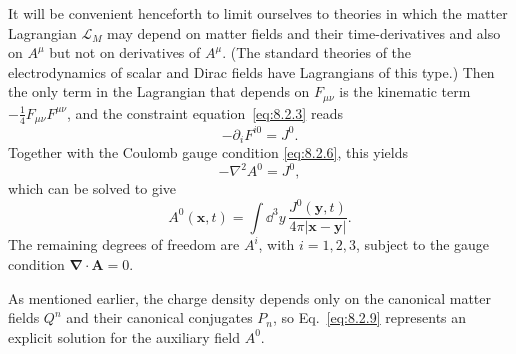It will be convenient henceforth to limit ourselves to theories in which
the matter Lagrangian $\mathcal L_M$ may depend on matter fields and their
time-derivatives and also on $A^\mu$ but not on derivatives of $A^\mu$. (The
standard theories of the electrodynamics of scalar and Dirac fields have
Lagrangians of this type.) Then the only term in the Lagrangian that depends
on $F_{\mu\nu}$ is the kinematic term $-\tfrac14F_{\mu\nu}F^{\mu\nu}$, and the
constraint equation~\eqref{eq:8.2.3} reads
\begin{equation}
  -\partial_iF^{i0}=J^0.
  \tag{8.2.7}\label{eq:8.2.7}
\end{equation}
Together with the Coulomb gauge condition \eqref{eq:8.2.6}, this yields
\begin{equation}
  -\nabla^2A^0=J^0,
  \tag{8.2.8}\label{eq:8.2.8}
\end{equation}
which can be solved to give
\begin{equation}
  A^0(\mathbf x,t)=\int \dd^3y\,
  \frac{J^0(\mathbf y,t)}{4\pi\lvert\mathbf x-\mathbf y\rvert}.
  \tag{8.2.9}\label{eq:8.2.9}
\end{equation}
The remaining degrees of freedom are $A^i$, with $i=1,2,3$, subject to the
gauge condition $\boldsymbol\nabla\cdot\mathbf A=0$.

As mentioned earlier, the charge density depends only on the canonical
matter fields $Q^n$ and their canonical conjugates $P_n$, so Eq.~\eqref{eq:8.2.9}
represents an explicit solution for the auxiliary field $A^0$.
